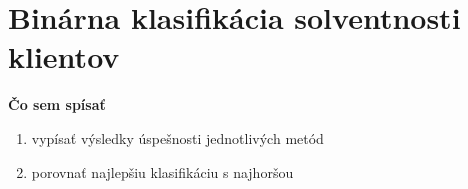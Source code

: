 \documentclass[report.tex]{subfiles}
\begin{document}
\section{Binárna klasifikácia solventnosti klientov}\label{sec:G}

\textbf{Čo sem spísať}
\begin{enumerate}
	\item vypísať výsledky úspešnosti jednotlivých metód
	\item porovnať najlepšiu klasifikáciu s najhoršou
\end{enumerate}
\end{document}
